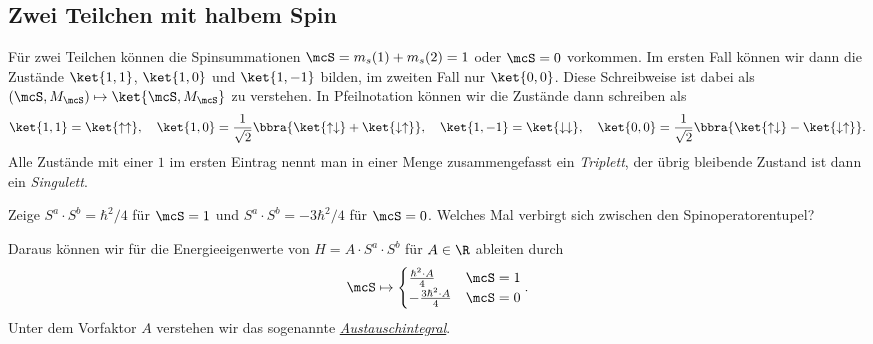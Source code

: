 \documentclass{subfiles}
\begin{document}
    \subsection{Zwei Teilchen mit halbem Spin}
        Für zwei Teilchen können die Spinsummationen $\mcS = m_s(1) + m_s(2) = 1$ oder $\mcS = 0$ vorkommen. Im ersten Fall können wir dann die Zustände $\ket{1,1}$, $\ket{1,0}$ und $\ket{1,-1}$ bilden, im zweiten Fall nur $\ket{0,0}$. Diese Schreibweise ist dabei als $(\mcS,M_\mcS)\mapsto \ket{\mcS,M_\mcS}$ zu verstehen. In Pfeilnotation können wir die Zustände dann schreiben als
        \[
            \ket{1,1} = \ket{\uparrow\uparrow},\quad\ket{1,0} = \frac{1}{\sqrt{2}}\bbra{\ket{\uparrow\downarrow} + \ket{\downarrow\uparrow}},\quad\ket{1,-1} = \ket{\downarrow\downarrow},\quad\ket{0,0} = \frac{1}{\sqrt{2}}\bbra{\ket{\uparrow\downarrow} - \ket{\downarrow\uparrow}}.
        \]
        Alle Zustände mit einer $1$ im ersten Eintrag nennt man in einer Menge zusammengefasst ein \emph{Triplett}, der übrig bleibende Zustand ist dann ein \emph{Singulett}.
        \begin{Aufgabe}
            \nr{} Zeige $S^a\cdot S^b = \hbar^2/4$ für $\mcS = 1$ und $S^a\cdot S^b = -3\hbar^2/4$ für $\mcS = 0$. Welches Mal verbirgt sich zwischen den Spinoperatorentupel?
        \end{Aufgabe}
        \noindent Daraus können wir für die Energieeigenwerte von $H = A\cdot S^a\cdot S^b$ für $A\in\R$ ableiten durch 
        \[
            \mcS\mapsto \begin{cases}
                \frac{\hbar^2\cdot A}{4} & \mcS = 1\\
                -\frac{3\hbar^2\cdot A}{4} & \mcS = 0
            \end{cases}.
        \]
        Unter dem Vorfaktor $A$ verstehen wir das sogenannte \href{https://de.wikipedia.org/wiki/Austauschwechselwirkung}{\emph{Austauschintegral}}. 
\end{document}
